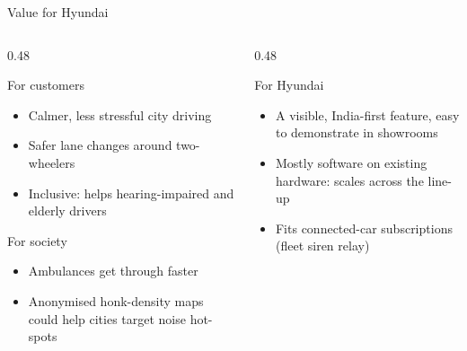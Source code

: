 \documentclass[aspectratio=169,10pt,t,xcolor=table]{beamer}
\begin{document}
\begin{frame}{Value for Hyundai}
\vspace{-0.3cm}
\begin{columns}[T]
\begin{column}{0.48\textwidth}
\begin{block}{For customers}
\begin{itemize}
  \item Calmer, less stressful city driving
  \item Safer lane changes around two-wheelers
  \item Inclusive: helps hearing-impaired and elderly drivers
\end{itemize}
\end{block}
\vspace{3pt}
\begin{block}{For society}
\begin{itemize}
  \item Ambulances get through faster
  \item Anonymised honk-density maps could help cities target noise hot-spots
\end{itemize}
\end{block}
\end{column}
\begin{column}{0.48\textwidth}
\begin{block}{For Hyundai}
\begin{itemize}
  \item A visible, India-first feature, easy to demonstrate in showrooms
  \item Mostly software on existing hardware: scales across the line-up
  \item Fits connected-car subscriptions (fleet siren relay)
\end{itemize}
\end{block}
\end{column}
\end{columns}
\vspace{2pt}
\begin{center}
\end{center}
\end{frame}
\end{document}
